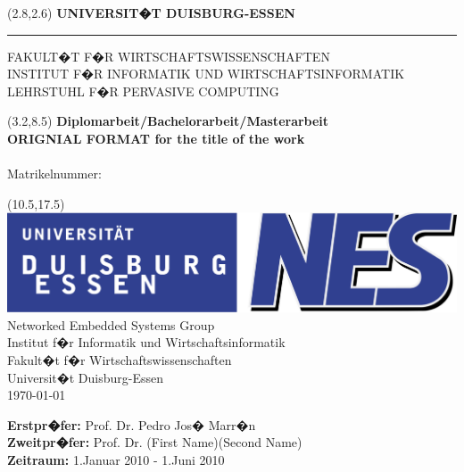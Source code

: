 \begin{titlepage}
\vspace*{-1cm}
\newlength{\links}
\setlength{\links}{0.9cm}
\setlength{\TPHorizModule}{1cm}
\setlength{\TPVertModule}{1cm}
\textblockorigin{0pt}{0pt}

\sf
\LARGE

\begin{textblock}{16.5}(2.8,2.6)
 \hspace*{-0.25cm} \textbf{UNIVERSIT�T DUISBURG-ESSEN} \\
 \hspace*{-1.15cm} \rule{5mm}{5mm} \hspace*{0.05cm} FAKULT�T F�R WIRTSCHAFTSWISSENSCHAFTEN\\
 \large{}INSTITUT F�R INFORMATIK UND WIRTSCHAFTSINFORMATIK \\
 \large{}LEHRSTUHL F�R PERVASIVE COMPUTING\\
\end{textblock}


\begin{textblock}{14.5}(3.2,8.5)
  \large
{ \bf Diplomarbeit/Bachelorarbeit/Masterarbeit} \\[1cm]
{\LARGE \Large\bf ORIGNIAL FORMAT for the title of the work} \\[1.3cm]
\studentFirsName { } \studentSecondName\\
Matrikelnummer: \studentMatrikelnummer
\end{textblock}



\begin{textblock}{10}(10.5,17.5)
\includegraphics[scale=0.23	]{content/images/NES_Logo.pdf}\\
\normalsize
\raggedleft
Networked Embedded Systems Group \\
Institut f�r Informatik und Wirtschaftsinformatik \\
Fakult�t f�r Wirtschaftswissenschaften \\
Universit�t Duisburg-Essen \\[2ex]

\today\\[15ex]
\raggedright
{\bf Erstpr�fer:} Prof. Dr. Pedro Jos� Marr�n \\
{\bf Zweitpr�fer:} Prof. Dr. (First Name)(Second Name) \\
{\bf Zeitraum:} 1.Januar 2010 - 1.Juni 2010\\
\end{textblock}


\end{titlepage}
